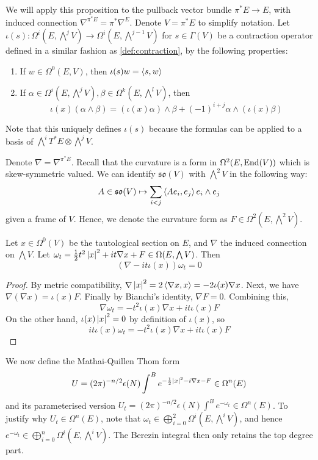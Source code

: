 We will apply this proposition to the pullback vector bundle $\pi^*E \to E$, 
with induced connection $\nabla^{\pi^*E}=\pi^*\nabla^E$. Denote $V=\pi^*E$ to
simplify notation.
Let $\iota(s):\Omega^i(E,\bigwedge^j V) \to
\Omega^i(E,\bigwedge^{j-1} V)$ for $s\in\Gamma(V)$ be a contraction operator
defined in a similar fashion as \ref{def:contraction}, by the following
properties:
\begin{enumerate}[(1)]
    \item If $w\in \Omega^0(E,V)$, then  $\iota(s)w = \gen{s,w}$
	\item If $\alpha\in\Omega^i(E,\bigwedge^jV),
		\beta\in\Omega^k(E,\bigwedge^lV)$, then 
	 \[
	\iota(x)(\alpha\wedge \beta) 
	= (\iota(x)\alpha)\wedge\beta + (-1)^{i+j}\alpha\wedge(\iota(x)\beta)
	\] 
\end{enumerate}
Note that this uniquely defines $\iota(s)$ because the formulas can be applied
to a basis of $\bigwedge^iT^*E\otimes \bigwedge^jV$.

Denote $\nabla = \nabla^{\pi^*E}$. 
Recall that the curvature is a form in $\Omega^2(E,\operatorname{End}(V))$ 
which is skew-symmetric valued. We can identify $\mathfrak{so}(V)$ with 
$\bigwedge^2 V$ in the following way:
\begin{equation} \label{eq:so_wedge}
	A\in \mathfrak{so}(V) \mapsto \sum_{i<j} \gen{Ae_i,e_j} e_i\wedge e_j
\end{equation}
given a frame of $V$. Hence, we denote the curvature form as $F \in
\Omega^2(E,\bigwedge^2V)$.

\begin{prop} \label{prop:closed_prop} %
	Let $x \in \Omega^0(V)$ be the tautological section on $E$, and $\nabla$ the
	induced connection on $\bigwedge V$.
	Let $\omega_t = \frac{1}{2}t^2\abs{x}^2 + it\nabla x + F 
	\in \Omega(E,\bigwedge V)$. Then 
	\[
		(\nabla - it\iota(x))\omega_t = 0
	\] 
\end{prop}
\begin{proof}
	 By metric compatibility,
	$\nabla \abs{x}^2 = 2\gen{\nabla x, x} = -2\iota(x)\nabla x$.
	Next, we have $\nabla(\nabla x) = \iota(x) F$.
	Finally by Bianchi's identity, $\nabla F = 0$. Combining this,
	\[
	\nabla \omega_t = -t^2\iota(x) \nabla x + it\iota(x)F 
	\] 
	On the other hand, $\iota(x)\abs{x}^2 = 0$ by definition of $\iota(x)$, so
	\[
	it\iota(x)\omega_t = -t^2\iota(x) \nabla x + it\iota(x)F
	\] 
\end{proof}

We now define the Mathai-Quillen Thom form 
\begin{equation}
	U = (2\pi)^{-n/2}\epsilon(N) \int^B e^{-\frac{1}{2}\abs{x}^2-i\nabla x - F} \in \Omega^n(E)
\end{equation}
and its parameterised version $U_t = (2\pi)^{-n/2}\epsilon(N) \int^B e^{-\omega_t} \in
\Omega^n(E)$. To justify why $U_t\in\Omega^n(E)$, note that
$\omega_t\in\bigoplus_{i=0}^2 \Omega^i(E,\bigwedge^iV)$, and hence 
$e^{-\omega_t} \in \bigoplus_{i=0}^n \Omega^i(E,\bigwedge^iV)$. The Berezin
integral then only retains the top degree part. 

